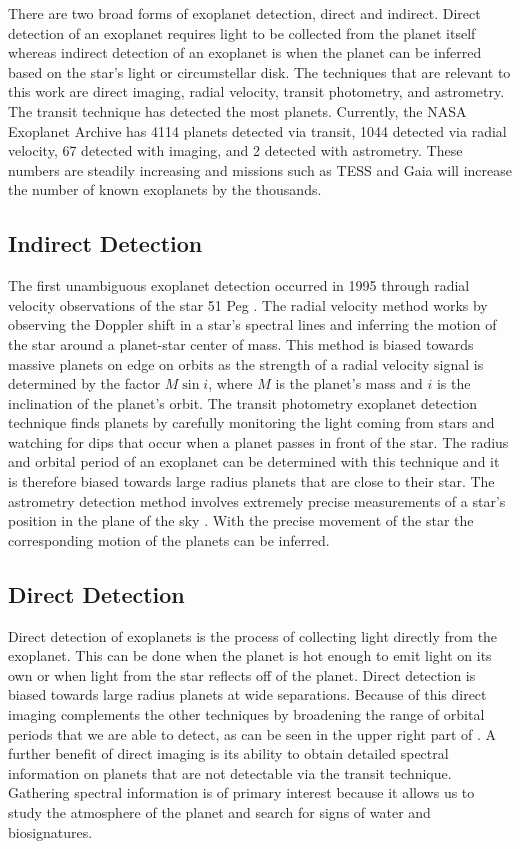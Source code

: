 There are two broad forms of exoplanet detection, direct and indirect. Direct
detection of an exoplanet requires light to be collected from the planet itself
whereas indirect detection of an exoplanet is when the planet can be inferred
based on the star's light or circumstellar disk. The techniques that are
relevant to this work are direct imaging, radial velocity, transit photometry,
and astrometry. The transit technique has detected the most planets. Currently,
the NASA Exoplanet Archive has 4114 planets detected via transit, 1044 detected
via radial velocity, 67 detected with imaging, and 2 detected with astrometry.
These numbers are steadily increasing and missions such as TESS
\citep{Huang2018} and Gaia \citep{Perryman2018a} will increase the number of
known exoplanets by the thousands.

\subsection{Indirect Detection} 

The first unambiguous exoplanet detection occurred in 1995 through radial
velocity observations of the star 51 Peg \citep{mayorJupitermassCompanion1995}.
The radial velocity method works by observing the Doppler shift in a star's
spectral lines and inferring the motion of the star around a planet-star center
of mass. This method is biased towards massive planets on edge on orbits as the
strength of a radial velocity signal is determined by the factor $M\sin{i}$,
where $M$ is the planet's mass and $i$ is the inclination of the planet's
orbit. The transit photometry exoplanet detection technique finds planets by
carefully monitoring the light coming from stars and watching for dips that
occur when a planet passes in front of the star. The radius and orbital period
of an exoplanet can be determined with this technique and it is therefore
biased towards large radius planets that are close to their star. The
astrometry detection method involves extremely precise measurements of a
star's position in the plane of the sky \citep{Perryman2018a}. With the
precise movement of the star the corresponding motion of the planets can be
inferred.


\subsection{Direct Detection}

Direct detection of exoplanets is the process of collecting light directly from
the exoplanet. This can be done when the planet is hot enough to emit light on
its own or when light from the star reflects off of the planet. Direct
detection is biased towards large radius planets at wide separations. Because
of this direct imaging complements the other techniques by broadening the range
of orbital periods that we are able to detect, as can be seen in the upper
right part of . A further benefit of
direct imaging is its ability to obtain detailed spectral information on
planets that are not detectable via the transit technique. Gathering spectral
information is of primary interest because it allows us to study the atmosphere
of the planet and search for signs of water and biosignatures.

